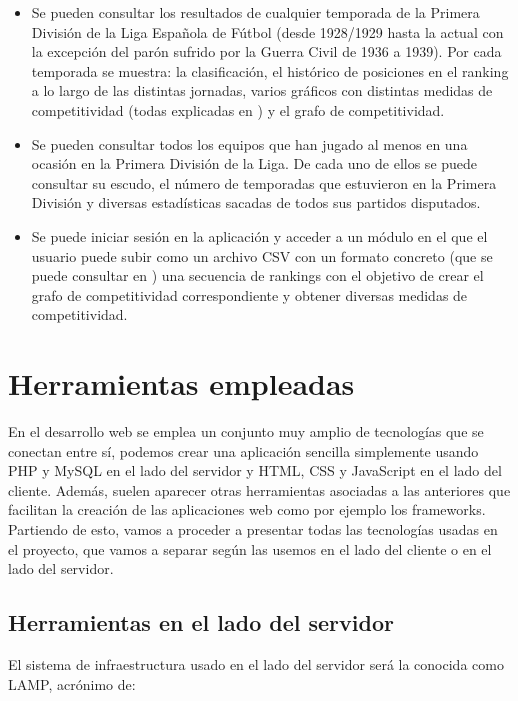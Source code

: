 \begin{itemize}
	\item Se pueden consultar los resultados de cualquier temporada de la Primera División de la Liga Española de Fútbol (desde 1928/1929 hasta la actual con la excepción del parón sufrido por la Guerra Civil de 1936 a 1939). Por cada temporada se muestra: la clasificación, el histórico de posiciones en el ranking a lo largo de las distintas jornadas, varios gráficos con distintas medidas de competitividad (todas explicadas en \cite[Capítulo 2]{tfgjose}) y el grafo de competitividad.
	\item Se pueden consultar todos los equipos que han jugado al menos en una ocasión en la Primera División de la Liga. De cada uno de ellos se puede consultar su escudo, el número de temporadas que estuvieron en la Primera División y diversas estadísticas sacadas de todos sus partidos disputados.
	\item Se puede iniciar sesión en la aplicación y acceder a un módulo en el que el usuario puede subir como un archivo CSV con un formato concreto (que se puede consultar en \cite[Pág 27]{tfgjose}) una secuencia de rankings con el objetivo de crear el grafo de competitividad correspondiente y obtener diversas medidas de competitividad.
\end{itemize}

\section{Herramientas empleadas}
En el desarrollo web se emplea un conjunto muy amplio de tecnologías que se conectan entre sí, podemos crear una aplicación sencilla simplemente usando PHP y MySQL en el lado del servidor y HTML, CSS y JavaScript en el lado del cliente. Además, suelen aparecer otras herramientas asociadas a las anteriores que facilitan la creación de las aplicaciones web como por ejemplo los frameworks.\\

Partiendo de esto, vamos a proceder a presentar todas las tecnologías usadas en el proyecto, que vamos a separar según las usemos en el lado del cliente o en el lado del servidor.

\newpage

\subsection{Herramientas en el lado del servidor}
El sistema de infraestructura usado en el lado del servidor será la conocida como LAMP, acrónimo de:

